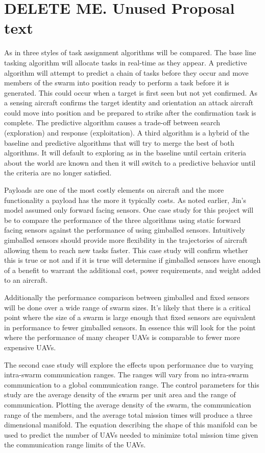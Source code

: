 \chapter{DELETE ME. Unused Proposal text}

As in \parencite{jin} three styles of task assignment algorithms will be compared.  The base line tasking algorithm will allocate tasks in real-time as they appear.   A predictive algorithm will attempt to predict a chain of tasks before they occur and move members of the swarm into position ready to perform a task before it is generated.  This could occur when a target is first seen but not yet confirmed.   As a sensing aircraft confirms the target identity and orientation an attack aircraft could move into position and be prepared to strike after the confirmation task is complete.  The predictive algorithm causes a trade-off between search (exploration) and response (exploitation).  A third algorithm is a hybrid of the baseline and predictive algorithms that will try to merge the best of both algorithms.  It will default to exploring as in the baseline until certain criteria about the world are known and then it will switch to a predictive behavior until the criteria are no longer satisfied.

Payloads are one of the most costly elements on aircraft and the more functionality a payload has the more it typically costs.  As noted earlier, Jin’s model assumed only forward facing sensors.  One case study for this project will be to compare the performance of the three algorithms using static forward facing sensors against the performance of using gimballed sensors.  Intuitively gimballed sensors should provide more flexibility in the trajectories of aircraft allowing them to reach new tasks faster.  This case study will confirm whether this is true or not and if it is true will determine if gimballed sensors have enough of a benefit to warrant the additional cost, power requirements, and weight added to an aircraft.  

Additionally the performance comparison between gimballed and fixed sensors will be done over a wide range of swarm sizes.  It’s likely that there is a critical point where the size of a swarm is large enough that fixed sensors are equivalent in performance to fewer gimballed sensors.  In essence this will look for the point where the performance of many cheaper UAVs is comparable to fewer more expensive UAVs.

The second case study will explore the effects upon performance due to varying intra-swarm communication ranges.  The ranges will vary from no intra-swarm communication to a global communication range.  The control parameters for this study are the average density of the swarm per unit area and the range of communication.  Plotting the average density of the swarm, the communication range of the members, and the average total mission times will produce a three dimensional manifold.  The equation describing the shape of this manifold can be used to predict the number of UAVs needed to minimize total mission time given the communication range limits of the UAVs.

